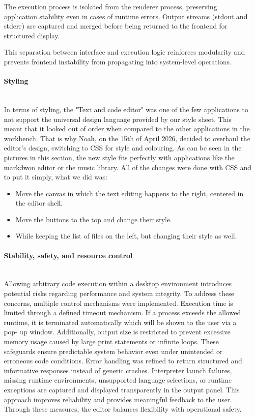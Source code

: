 \documentclass[a4paper,12pt]{article}
\begin{document}
The execution process is isolated from the renderer process, preserving application stability even in cases of runtime errors. Output streams (stdout and stderr) are captured and merged before being returned to the frontend for structured display.

This separation between interface and execution logic reinforces modularity and prevents frontend instability from propagating into system-level operations.

\newpage
\paragraph{Styling}\mbox{} \\
In terms of styling, the "Text and code editor" was one of the few applications to not support the universal design language provided by our style sheet. 
This meant that it looked out of order when compared to the other applications in the workbench. 
That is why Noah, on the 15th of April 2026, decided to overhaul the editor’s design, switching to CSS for style and colouring. 
As can be seen in the pictures in this section, the new style fits perfectly with applications like the markdwon editor or the music library. 
All of the changes were done with CSS and to put it simply, what we did was: 
\begin{itemize}
  \item Move the canvas in which the text editing happens to the right, centered in the editor shell. 
  \item Move the buttons to the top and change their style. 
  \item While keeping the list of files on the left, but changing their style as well. 
\end{itemize}

\paragraph{Stability, safety, and resource control}\mbox{} \\
Allowing arbitrary code execution within a desktop environment introduces potential risks regarding performance and system integrity. To address these concerns, multiple control mechanisms were implemented.
Execution time is limited through a defined timeout mechanism. If a process exceeds the allowed runtime, it is terminated automatically which will be shown to the user via a pop- up window. 
Additionally, output size is restricted to prevent excessive memory usage caused by large print statements or infinite loops. These safeguards ensure predictable system behavior even under unintended or erroneous code conditions.
Error handling was refined to return structured and informative responses instead of generic crashes. Interpreter launch failures, missing runtime environments, unsupported language selections, or runtime exceptions are captured and displayed transparently in the output panel. This approach improves reliability and provides meaningful feedback to the user.
Through these measures, the editor balances flexibility with operational safety.
\end{document}
